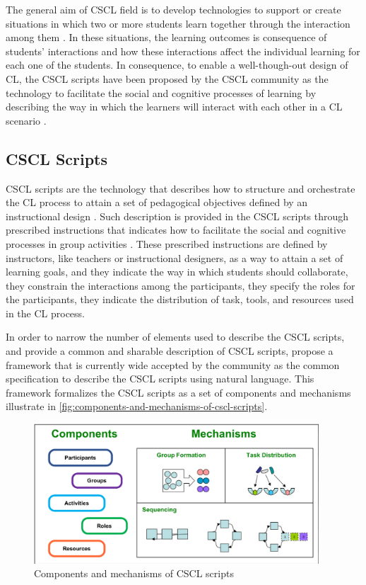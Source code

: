 The general aim of CSCL field is to develop technologies to support or create situations in which two or more students learn together through the interaction among them \cite{Dillenbourg1999}. In these situations, the learning outcomes is consequence of students' interactions and how these interactions affect the individual learning for each one of the students. In consequence, to enable a well-though-out design of CL, the CSCL scripts have been proposed by the CSCL community as the technology to facilitate the social and cognitive processes of learning by describing the way in which the learners will interact with each other in a CL scenario \cite{HarrerKobbeMalzahn2007}.

\subsection{CSCL Scripts}
\label{sec:cscl-scripts}

CSCL scripts are the technology that describes how to structure and orchestrate the CL process to attain a set of pedagogical objectives defined by an instructional design \cite{DillenbourgJermann2007}. Such description is provided in the CSCL scripts through prescribed instructions that indicates how to facilitate the social and cognitive processes in group activities \cite{Dillenbourg2002}. These prescribed instructions are defined by instructors, like teachers or instructional designers, as a way to attain a set of learning goals, and they indicate the way in which students should collaborate, they constrain the interactions among the participants, they specify the roles for the participants, they indicate the distribution of task, tools, and resources used in the CL process.

In order to narrow the number of elements used to describe the CSCL scripts, and provide a common and sharable description of CSCL scripts,  propose a framework that is currently wide accepted by the community as the common specification to describe the CSCL scripts using natural language. This framework formalizes the CSCL scripts as a set of components and mechanisms illustrate in \autoref{fig:components-and-mechanisms-of-cscl-scripts}.


\begin{figure}[htb]
 \caption{Components and mechanisms of CSCL scripts}
 \label{fig:components-and-mechanisms-of-cscl-scripts}
 \centering
 \includegraphics[width=0.95\textwidth]{images/components-and-mechanisms-of-cscl-scripts}
\end{figure}

